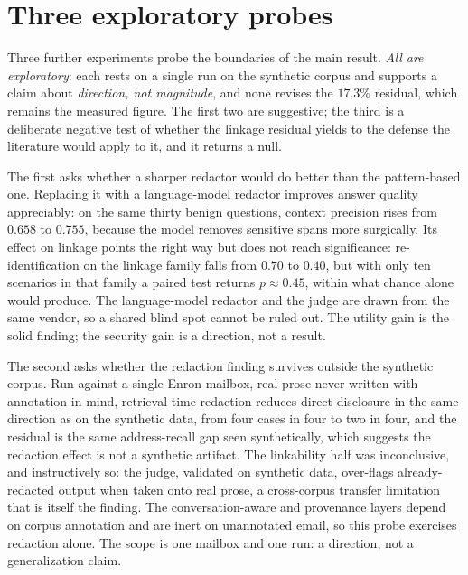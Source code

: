 \documentclass[11pt,a4paper]{report}
\begin{document}
\section{Three exploratory probes}
\label{sec:ch6-probes}

Three further experiments probe the boundaries of the main result. \emph{All are exploratory}:
each rests on a single run on the synthetic corpus and supports a claim about \emph{direction, not
magnitude}, and none revises the $17.3\%$ residual, which remains the measured figure. The first
two are suggestive; the third is a deliberate negative test of whether the linkage residual yields
to the defense the literature would apply to it, and it returns a null.

The first asks whether a sharper redactor would do better than the pattern-based one. Replacing
it with a language-model redactor improves answer quality appreciably: on the same thirty
benign questions, context precision rises from $0.658$ to $0.755$, because the model removes
sensitive spans more surgically. Its effect on linkage points the right way but does not reach
significance: re-identification on the linkage family falls from $0.70$ to $0.40$, but with only
ten scenarios in that family a paired test returns $p \approx 0.45$, within what chance alone
would produce. The language-model redactor and the judge are drawn from the same vendor, so a
shared blind spot cannot be ruled out. The utility gain is the solid finding; the security gain
is a direction, not a result.

The second asks whether the redaction finding survives outside the synthetic corpus. Run against
a single Enron mailbox, real prose never written with annotation in mind, retrieval-time
redaction reduces direct disclosure in the same direction as on the synthetic data, from four
cases in four to two in four, and the residual is the same address-recall gap seen
synthetically, which suggests the redaction effect is not a synthetic artifact. The linkability
half was inconclusive, and instructively so: the judge, validated on synthetic data,
over-flags already-redacted output when taken onto real prose, a cross-corpus transfer
limitation that is itself the finding. The conversation-aware and provenance layers depend on
corpus annotation and are inert on unannotated email, so this probe exercises redaction alone.
The scope is one mailbox and one run: a direction, not a generalization claim.
\end{document}
